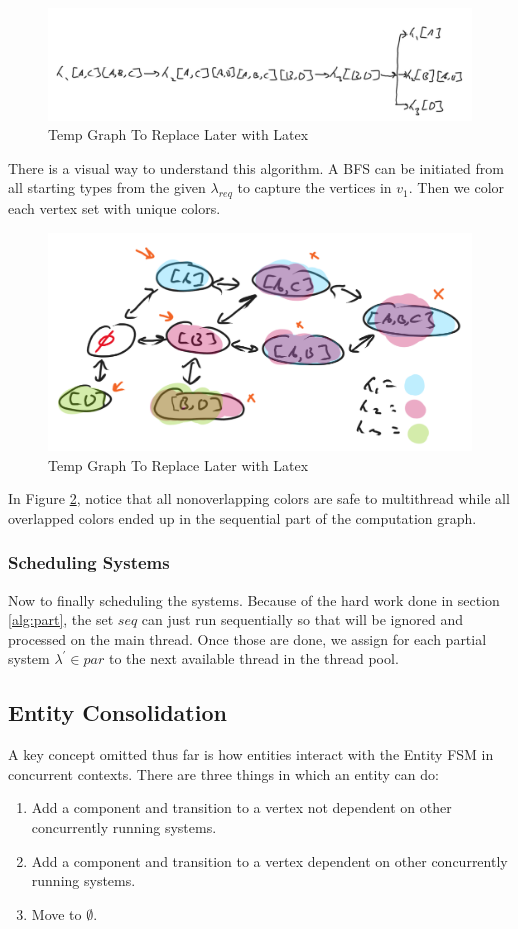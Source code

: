 \begin{figure}[H]
    \centering
    \includegraphics[width=0.5\linewidth]{resources/computation_graph.png}
    \caption{Temp Graph To Replace Later with Latex}
    \label{fig:temp1}
\end{figure}

There is a visual way to understand this algorithm. A BFS can be initiated from all starting types from the given $\lambda_{req}$ to capture the vertices in $v_1$. Then we color each vertex set with unique colors. 

\begin{figure}[H]
    \centering
    \includegraphics[width=0.5\linewidth]{resources/color_graph.png}
    \caption{Temp Graph To Replace Later with Latex}
    \label{fig:graph2}
\end{figure}

In Figure \ref{fig:graph2}, notice that all nonoverlapping colors are safe to multithread while all overlapped colors ended up in the sequential part of the computation graph.

\subsubsection{Scheduling Systems}
Now to finally scheduling the systems. Because of the hard work done in section \ref{alg:part}, the set $seq$ can just run sequentially so that will be ignored and processed on the main thread. Once those are done, we assign for each partial system $\lambda^\prime \in par$ to the next available thread in the thread pool. 

\subsection{Entity Consolidation}
A key concept omitted thus far is how entities interact with the Entity FSM in concurrent contexts. There are three things in which an entity can do:
\begin{enumerate}
    \item Add a component and transition to a vertex not dependent on other concurrently running systems. 
    \item Add a component and transition to a vertex dependent on other concurrently running systems. 
    \item Move to $\emptyset$.
\end{enumerate}


